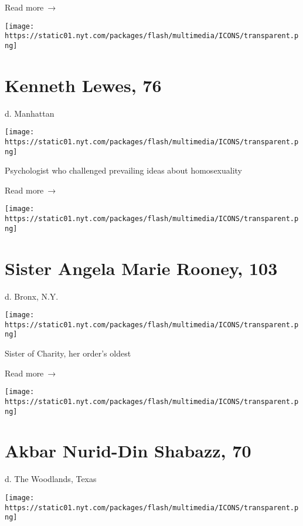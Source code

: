  Read more~→

\href{https://www.nytimes.com/2020/06/26/science/kenneth-lewes-dead-coronavirus.html}{}

\texttt{[image: https://static01.nyt.com/packages/flash/multimedia/ICONS/transparent.png]}

\hypertarget{kenneth-lewes-76}{%
\section{Kenneth Lewes, 76}\label{kenneth-lewes-76}}

d. Manhattan

\texttt{[image: https://static01.nyt.com/packages/flash/multimedia/ICONS/transparent.png]}

Psychologist who challenged prevailing ideas about homosexuality

 Read more~→

\href{https://www.nytimes.com/2020/06/26/obituaries/Angela-Rooney-dead-coronavirus.html}{}

\texttt{[image: https://static01.nyt.com/packages/flash/multimedia/ICONS/transparent.png]}

\hypertarget{sister-angela-marie-rooney-103}{%
\section{Sister Angela Marie Rooney,
103}\label{sister-angela-marie-rooney-103}}

d. Bronx, N.Y.

\texttt{[image: https://static01.nyt.com/packages/flash/multimedia/ICONS/transparent.png]}

Sister of Charity, her order's oldest

 Read more~→

\href{https://www.nytimes.com/2020/06/25/obituaries/akbar-nurid-din-shabazz-dead-coronavirus.html}{}

\texttt{[image: https://static01.nyt.com/packages/flash/multimedia/ICONS/transparent.png]}

\hypertarget{akbar-nurid-din-shabazz-70}{%
\section{Akbar Nurid-Din Shabazz, 70}\label{akbar-nurid-din-shabazz-70}}

d. The Woodlands, Texas

\texttt{[image: https://static01.nyt.com/packages/flash/multimedia/ICONS/transparent.png]}

